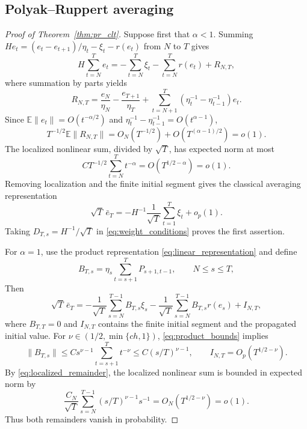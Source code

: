 \subsection{Polyak--Ruppert averaging}
\begin{proof}[Proof of Theorem~\ref{thm:pr_clt}]
Suppose first that $\alpha<1$. Summing
$He_t=(e_t-e_{t+1})/\eta_t-\xi_t-r(e_t)$ from $N$ to $T$ gives
\[
H\sum_{t=N}^Te_t=-\sum_{t=N}^T\xi_t-
\sum_{t=N}^Tr(e_t)+R_{N,T},
\]
where summation by parts yields
\[
R_{N,T}=\frac{e_N}{\eta_N}-\frac{e_{T+1}}{\eta_T}
+\sum_{t=N+1}^T(\eta_t^{-1}-\eta_{t-1}^{-1})e_t.
\]
Since $\mathbb E\|e_t\|=O(t^{-\alpha/2})$ and
$\eta_t^{-1}-\eta_{t-1}^{-1}=O(t^{\alpha-1})$,
\[
T^{-1/2}\mathbb E\|R_{N,T}\|
=O_N(T^{-1/2})+O(T^{(\alpha-1)/2})=o(1).
\]
The localized nonlinear sum, divided by $\sqrt T$, has expected norm
at most
\[
C T^{-1/2}\sum_{t=N}^Tt^{-\alpha}=O(T^{1/2-\alpha})=o(1).
\]
Removing localization and the finite initial segment gives the classical
averaging representation
\cite{polyakjuditsky1992}
\[
\sqrt T\,\bar e_T=-H^{-1}\frac1{\sqrt T}\sum_{t=1}^T\xi_t+o_p(1).
\]
Taking $D_{T,s}=H^{-1}/\sqrt T$ in
\eqref{eq:weight_conditions} proves the first assertion.

For $\alpha=1$, use the product representation
\eqref{eq:linear_representation} and define
\[
B_{T,s}=\eta_s\sum_{t=s+1}^TP_{s+1,t-1},\qquad N\le s\le T,
\]
Then
\[
\sqrt T\,\bar e_T=-\frac1{\sqrt T}\sum_{s=N}^{T-1}B_{T,s}\xi_s
-\frac1{\sqrt T}\sum_{s=N}^{T-1}B_{T,s}r(e_s)+I_{N,T},
\]
where $B_{T,T}=0$ and $I_{N,T}$ contains the finite initial segment and the propagated
initial value. For $\nu\in(1/2,\min\{ch,1\})$,
\eqref{eq:product_bounds} implies
\begin{equation}\label{eq:averaging_weight_bound}
\|B_{T,s}\|\le C s^{\nu-1}\sum_{t=s+1}^Tt^{-\nu}
\le C(s/T)^{\nu-1},\qquad
I_{N,T}=O_p(T^{1/2-\nu}).
\end{equation}
By \eqref{eq:localized_remainder}, the localized nonlinear sum is
bounded in expected norm by
\[
\frac{C_N}{\sqrt T}\sum_{s=N}^{T-1}(s/T)^{\nu-1}s^{-1}
=O_N(T^{1/2-\nu})=o(1).
\]
Thus both remainders vanish in probability.


\end{proof}
